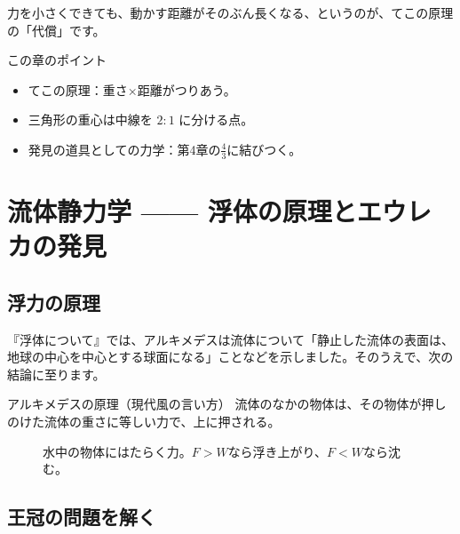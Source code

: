 \documentclass[a4paper,11pt,openany]{ltjsbook}
\begin{document}
力を小さくできても、動かす距離がそのぶん長くなる、というのが、てこの原理の「代償」です。

\begin{pointbox}{この章のポイント}
\begin{itemize}[leftmargin=1.5em]
\item てこの原理：重さ×距離がつりあう。
\item 三角形の重心は中線を $2:1$ に分ける点。
\item 発見の道具としての力学：第4章の$\frac43$に結びつく。
\end{itemize}
\end{pointbox}

\chapter{流体静力学 —— 浮体の原理とエウレカの発見}

\section{浮力の原理}

『浮体について』では、アルキメデスは流体について「静止した流体の表面は、地球の中心を中心とする球面になる」ことなどを示しました。そのうえで、次の結論に至ります。

\begin{pointbox}{アルキメデスの原理（現代風の言い方）}
流体のなかの物体は、その物体が押しのけた流体の重さに等しい力で、上に押される。
\end{pointbox}

\begin{figure}[htbp]
\centering
{}
\caption{水中の物体にはたらく力。$F>W$なら浮き上がり、$F<W$なら沈む。}
\end{figure}

\section{王冠の問題を解く}
\end{document}
